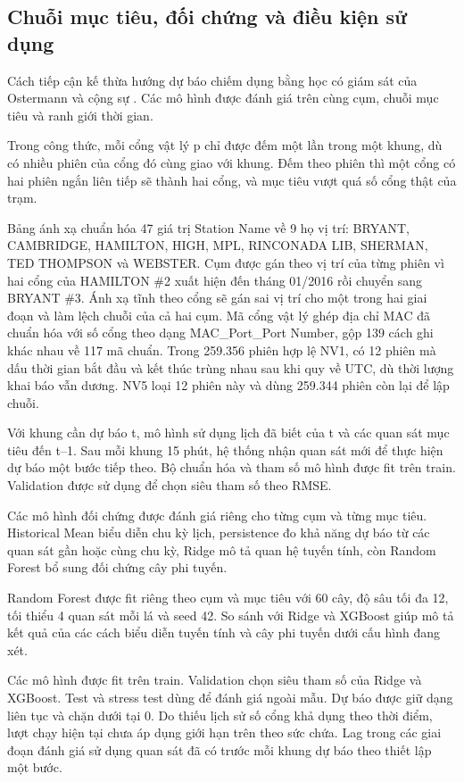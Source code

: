 \documentclass[conference,a4paper]{IEEEtran}
\begin{document}
\subsection{Chuỗi mục tiêu, đối chứng và điều kiện sử dụng}

Cách tiếp cận kế thừa hướng dự báo chiếm dụng bằng học có giám sát của Ostermann và cộng sự \cite{ostermann2022}. Các mô hình được đánh giá trên cùng cụm, chuỗi mục tiêu và ranh giới thời gian.

Trong công thức, mỗi cổng vật lý p chỉ được đếm một lần trong một khung, dù có nhiều phiên của cổng đó cùng giao với khung. Đếm theo phiên thì một cổng có hai phiên ngắn liên tiếp sẽ thành hai cổng, và mục tiêu vượt quá số cổng thật của trạm.

Bảng ánh xạ chuẩn hóa 47 giá trị Station Name về 9 họ vị trí: BRYANT, CAMBRIDGE, HAMILTON, HIGH, MPL, RINCONADA LIB, SHERMAN, TED THOMPSON và WEBSTER. Cụm được gán theo vị trí của từng phiên vì hai cổng của HAMILTON \#2 xuất hiện đến tháng 01/2016 rồi chuyển sang BRYANT \#3. Ánh xạ tĩnh theo cổng sẽ gán sai vị trí cho một trong hai giai đoạn và làm lệch chuỗi của cả hai cụm. Mã cổng vật lý ghép địa chỉ MAC đã chuẩn hóa với số cổng theo dạng {MAC}\_Port\_{Port Number}, gộp 139 cách ghi khác nhau về 117 mã chuẩn. Trong 259.356 phiên hợp lệ NV1, có 12 phiên mà dấu thời gian bắt đầu và kết thúc trùng nhau sau khi quy về UTC, dù thời lượng khai báo vẫn dương. NV5 loại 12 phiên này và dùng 259.344 phiên còn lại để lập chuỗi.

Với khung cần dự báo t, mô hình sử dụng lịch đã biết của t và các quan sát mục tiêu đến t–1. Sau mỗi khung 15 phút, hệ thống nhận quan sát mới để thực hiện dự báo một bước tiếp theo. Bộ chuẩn hóa và tham số mô hình được fit trên train. Validation được sử dụng để chọn siêu tham số theo RMSE.

Các mô hình đối chứng được đánh giá riêng cho từng cụm và từng mục tiêu. Historical Mean biểu diễn chu kỳ lịch, persistence đo khả năng dự báo từ các quan sát gần hoặc cùng chu kỳ, Ridge mô tả quan hệ tuyến tính, còn Random Forest bổ sung đối chứng cây phi tuyến.

Random Forest được fit riêng theo cụm và mục tiêu với 60 cây, độ sâu tối đa 12, tối thiểu 4 quan sát mỗi lá và seed 42. So sánh với Ridge và XGBoost giúp mô tả kết quả của các cách biểu diễn tuyến tính và cây phi tuyến dưới cấu hình đang xét.

Các mô hình được fit trên train. Validation chọn siêu tham số của Ridge và XGBoost. Test và stress test dùng để đánh giá ngoài mẫu. Dự báo được giữ dạng liên tục và chặn dưới tại 0. Do thiếu lịch sử số cổng khả dụng theo thời điểm, lượt chạy hiện tại chưa áp dụng giới hạn trên theo sức chứa. Lag trong các giai đoạn đánh giá sử dụng quan sát đã có trước mỗi khung dự báo theo thiết lập một bước.
\end{document}
